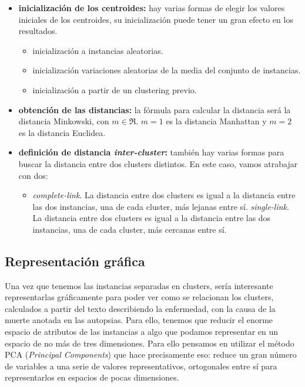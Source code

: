 \documentclass[10pt,a4paper,draft]{article}
\begin{document}
\begin{itemize}
\item \textbf{inicialización de los centroides:} hay varias formas de elegir los valores iniciales de los centroides, su inicialización puede tener un gran efecto en los resultados.
    \begin{itemize}
    \item inicialización a instancias aleatorias.
    \item inicialización variaciones aleatorias de la media del conjunto de instancias.
    \item inicialización a partir de un clustering previo.
    \end{itemize}
\item \textbf{obtención de las distancias:} la fórmula para calcular la distancia será la distancia Minkowski, con \(m \in \Re\). \(m=1\) es la distancia Manhattan y \(m=2\) es la distancia Euclidea.
\item \textbf{definición de distancia \textit{inter-cluster}:} también hay varias formas para buscar la distancia entre dos clusters distintos. En este caso, vamos atrabajar con dos:
    \begin{itemize}
    \item \textit{complete-link}. La distancia entre dos clusters es igual a la distancia entre las dos instancias, una de cada cluster, más lejanas entre sí.
    \textit{single-link}. La distancia entre dos clusters es igual a la distancia entre las dos instancias, una de cada cluster, más cercanas entre sí.
    \end{itemize}

\end{itemize}

\subsection{Representación gráfica}
Una vez que tenemos las instancias separadas en clusters, sería interesante representarlas gráficamente para poder ver como se relacionan los clusters, calculados a partir del texto describiendo la enfermedad, con la causa de la muerte anotada en las autopsias. Para ello, tenemos que reducir el enorme espacio de atributos de las instancias a algo que podamos representar en un espacio de no más de tres dimensiones. Para ello pensamos en utilizar el método PCA (\textit{Principal Components}) que hace precisamente eso: reduce un gran número de variables a una serie de valores representativos, ortogonales entre sí para representarlos en espacios de pocas dimensiones.\\
\end{document}
